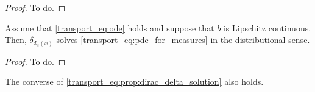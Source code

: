 \documentclass{article}
\begin{document}
\begin{proof}
    To do.
\end{proof}

\begin{proposition}\label{transport_eq:prop:dirac_delta_solution}
Assume that \eqref{transport_eq:ode} holds and suppose that $b$ is Lipschitz continuous. Then, $\delta_{\Phi_t(x)}$ solves \eqref{transport_eq:pde_for_measures} in the distributional sense.
\end{proposition}

\begin{proof}
    To do.
\end{proof}

\begin{remark} The converse of \eqref{transport_eq:prop:dirac_delta_solution} also holds.
\end{remark}

\printbibliography
\end{document}
